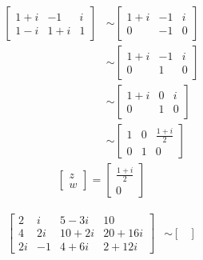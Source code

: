 \documentclass[11pt, a4paper, norsk]{NTNUoving}
\begin{document}
\begin{oppgave}
    \begin{punkt}
    \begin{align*}
        \begin{bmatrix} %
            1+i & -1 & i\\
            1-i & 1+i & 1
        \end{bmatrix}
           &\sim
        \begin{bmatrix} %
            1+i & -1 & i\\
            0 & -1 & 0
        \end{bmatrix}
           \\&\sim
        \begin{bmatrix} %
            1+i & -1 & i\\
            0 & 1 & 0
        \end{bmatrix}
           \\&\sim
        \begin{bmatrix} %
            1+i & 0 & i\\
            0 & 1 & 0
        \end{bmatrix}
           \\&\sim
        \begin{bmatrix} %
            1 & 0 & \frac{1+i}{2}\\
            0 & 1 & 0
        \end{bmatrix}
    \end{align*}
    \begin{align*}
        \begin{bmatrix} %
            z\\
            w
        \end{bmatrix}
           =
        \begin{bmatrix} %
            \frac{1+i}{2}\\
            0
        \end{bmatrix}
    \end{align*}
    \end{punkt}
    \begin{punkt}
        \begin{align*}
        \begin{bmatrix} %
            2 & i & 5-3i & 10\\
            4 & 2i & 10+2i & 20+16i\\
            2i & -1 & 4+6i & 2 + 12i
        \end{bmatrix}
           &\sim
        \begin{bmatrix} %

\end{bmatrix}
\end{align*}
\end{punkt}
\end{oppgave}
\end{document}
